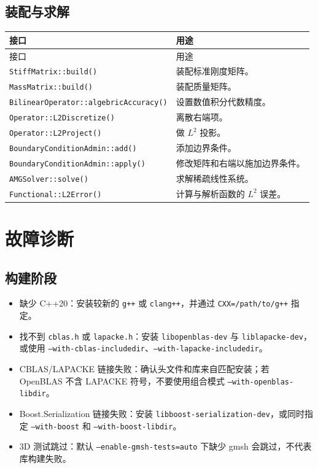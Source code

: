 \documentclass[UTF8,openany,zihao=-4,scheme=chinese]{ctexbook}
\newcommand{\file}[1]{\nolinkurl{#1}}
\newcommand{\class}[1]{\texttt{#1}}
\newcommand{\cmd}[1]{\texttt{#1}}
\begin{document}
\section{装配与求解}

\begin{longtable}{p{}p{}}
\toprule
接口 & 用途\\
\midrule
\endfirsthead
\toprule
接口 & 用途\\
\midrule
\endhead
\class{StiffMatrix::build()} & 装配标准刚度矩阵。\\
\class{MassMatrix::build()} & 装配质量矩阵。\\
\class{BilinearOperator::algebricAccuracy()} & 设置数值积分代数精度。\\
\class{Operator::L2Discretize()} & 离散右端项。\\
\class{Operator::L2Project()} & 做 $L^2$ 投影。\\
\class{BoundaryConditionAdmin::add()} & 添加边界条件。\\
\class{BoundaryConditionAdmin::apply()} & 修改矩阵和右端以施加边界条件。\\
\class{AMGSolver::solve()} & 求解稀疏线性系统。\\
\class{Functional::L2Error()} & 计算与解析函数的 $L^2$ 误差。\\
\bottomrule
\end{longtable}

\chapter{故障诊断}

\section{构建阶段}

\begin{itemize}[leftmargin=2em]
  \item 缺少 C++20：安装较新的 \cmd{g++} 或 \cmd{clang++}，并通过 \cmd{CXX=/path/to/g++} 指定。
  \item 找不到 \file{cblas.h} 或 \file{lapacke.h}：安装 \cmd{libopenblas-dev} 与 \cmd{liblapacke-dev}，或使用 \cmd{--with-cblas-includedir}、\cmd{--with-lapacke-includedir}。
  \item CBLAS/LAPACKE 链接失败：确认头文件和库来自匹配安装；若 OpenBLAS 不含 LAPACKE 符号，不要使用组合模式 \cmd{--with-openblas-libdir}。
  \item Boost.Serialization 链接失败：安装 \cmd{libboost-serialization-dev}，或同时指定 \cmd{--with-boost} 和 \cmd{--with-boost-libdir}。
  \item 3D 测试跳过：默认 \cmd{--enable-gmsh-tests=auto} 下缺少 gmsh 会跳过，不代表库构建失败。
\end{itemize}
\end{document}
